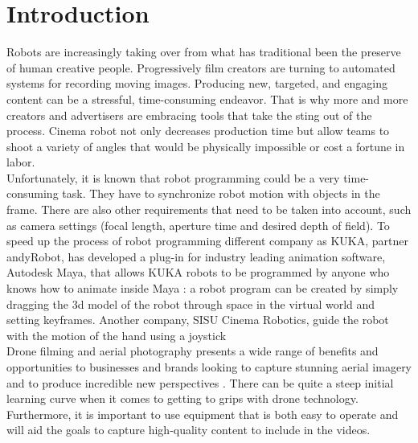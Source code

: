 \chapter*{Introduction}
\markboth{}{}
\label{chap:intro}

Robots are increasingly taking over from what has traditional been the preserve of human creative people. Progressively film creators are turning to automated systems for recording moving images. Producing new, targeted, and engaging content can be a stressful, time-consuming endeavor. That is why more and more creators and advertisers are embracing tools that take the sting out of the process. Cinema robot not only decreases production time but allow teams to shoot a variety of angles that would be physically impossible or cost a fortune in labor. \\

\noindent Unfortunately, it is known that robot programming could be a very time-consuming task. They have to synchronize robot motion with objects in the frame. There are also other requirements that need to be taken into account, such as camera settings (focal length, aperture time and desired depth of field). To speed up the process of robot programming different company as KUKA, partner andyRobot, has developed a plug-in for industry leading animation software, Autodesk Maya, that allows KUKA robots to be programmed by anyone who knows how to animate inside Maya \cite[]{Animatin29:online}: a robot program can be created by simply dragging the \gls{3d} model of the robot through space in the virtual world and setting keyframes. Another company, SISU Cinema Robotics, guide the robot with the motion of the hand using a joystick \cite[]{SISUCine24:online} \\

\noindent Drone filming and aerial photography presents a wide range of benefits and opportunities to businesses and brands looking to capture stunning aerial imagery and to produce incredible new perspectives \cite[]{TopTipsf86:online}. There can be quite a steep initial learning curve when it comes to getting to grips with drone technology. Furthermore, it is important to use equipment that is both easy to operate and will aid the goals to capture high-quality content to include in the videos. \\


